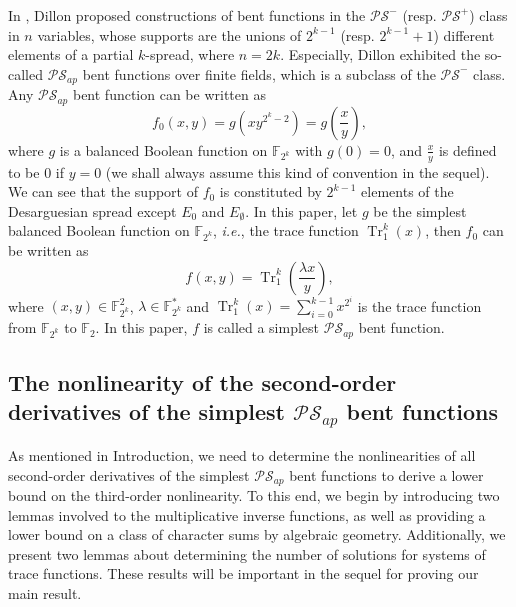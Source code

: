 \documentclass{article}
\newcommand{\F}{\mathbb{F}}
\newcommand{\0}{\textbf{0}}
\newcommand{\1}{\textbf{1}}
\newcommand{\TRACE}{\operatorname{Tr}_1^k}
\theoremstyle{plain}
\begin{document}
In \cite{Dillon1974PSbent}, Dillon proposed constructions of bent functions in the $\mathcal{PS}^-$ (resp. $\mathcal{PS}^+$) class in $n$ variables, whose supports are the unions of $2^{k-1}$ (resp. $2^{k-1}+1$) different elements of a partial $k$-spread, where $n=2k$.
Especially, Dillon exhibited the so-called $\mathcal{PS}_{ap}$ bent functions over finite fields, which is a subclass of the $\mathcal{PS}^-$ class.
Any $\mathcal{PS}_{ap}$ bent function can be written as 
\begin{equation*}\label{Eqn_PS_bent}
    f_0(x,y)=g\left(xy^{2^k-2}\right)=g\left(\frac{x}{y}\right),
\end{equation*}
where $g$ is a balanced Boolean function on $\F_{2^{k}}$ with $g(0)=0$, and $\frac{x}{y}$ is defined to be $0$ if $y=0$ (we shall always assume this kind of convention in the sequel).
We can see that the support of $f_0$ is constituted by $2^{k-1}$ elements of the Desarguesian spread except $E_0$ and $E_{\emptyset}$.
In this paper, let $g$ be the simplest balanced Boolean function on $\F_{2^k}$, \emph{i.e.}, the trace function $\TRACE(x)$, then 
$f_0$ can be written as  
\begin{equation*}\label{sub-bent}
    f(x,y)=\TRACE\left(\frac{\lambda x}{y}\right),
\end{equation*}
where $(x,y)\in\F_{2^k}^2$, $\lambda\in\F_{2^k}^{*}$ and $\TRACE(x)=\sum\limits_{i=0}^{k-1}x^{2^i}$ is the trace function from $\F_{2^k}$ to $\F_2$.
In this paper, $f$ is called a simplest $\mathcal{PS}_{ap}$ bent function.
    
    \subsection{The nonlinearity of the second-order derivatives of the simplest $\mathcal{PS}_{ap}$ bent functions}
    As mentioned in Introduction,
    we need to determine the nonlinearities of all second-order derivatives of the simplest $\mathcal{PS}_{ap}$ bent functions to derive a lower bound on the third-order nonlinearity.
    To this end, we begin by introducing two lemmas involved to the multiplicative inverse functions,
    as well as providing a lower bound on a class of character sums by algebraic geometry.
    Additionally, we present two lemmas about determining the number of solutions for systems of trace functions.
    These results will be important in the sequel for proving our main result.
\end{document}

